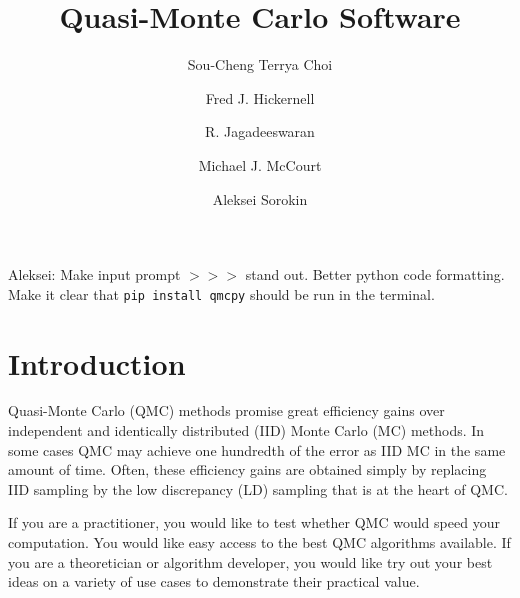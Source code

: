 \documentclass[graybox,footinfo]{svmult}
\newcommand{\AGSComment}[1]{{\color{cyan} Aleksei: #1}}
\begin{document}
\title*{Quasi-Monte Carlo Software}
\author{Sou-Cheng Terrya Choi \and Fred J. Hickernell \and R. Jagadeeswaran \and Michael J. McCourt \and Aleksei Sorokin}

\maketitle


\AGSComment{Make input prompt $>>>$ stand out. Better python code formatting. Make it clear that \texttt{pip install qmcpy} should be run in the terminal.}



\section{Introduction}
Quasi-Monte Carlo (QMC) methods promise great efficiency gains over independent and identically distributed (IID) Monte Carlo (MC) methods.  In some cases QMC may achieve one hundredth of the error as IID MC in the same amount of time. Often, these efficiency gains are obtained simply by  replacing IID sampling by the low discrepancy (LD) sampling that is at the heart of QMC. 

If you are a practitioner, you would like to test whether QMC would speed your computation.  You would like easy access to the best QMC algorithms available.  If you are a theoretician or algorithm developer, you would like try out your best ideas on a variety of use cases to demonstrate their practical value.  
\end{document}
